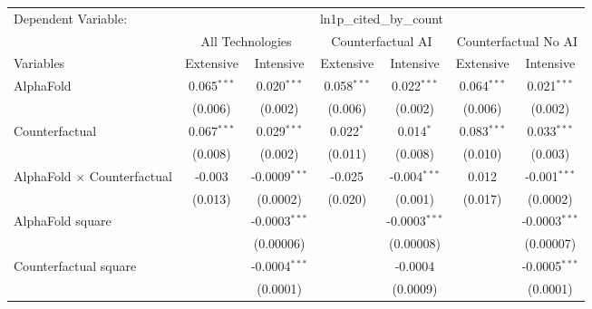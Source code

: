 \begingroup
\centering
\begin{tabular}{lcccccc}
   \tabularnewline \midrule \midrule
   Dependent Variable: & \multicolumn{6}{c}{ln1p\_cited\_by\_count}\\
 & \multicolumn{2}{c}{All Technologies} & \multicolumn{2}{c}{Counterfactual AI} & \multicolumn{2}{c}{Counterfactual No AI} \\
\cmidrule(lr){1-1}\cmidrule(lr){2-3} \cmidrule(lr){4-5} \cmidrule(lr){6-7}
Variables & \multicolumn{1}{c}{Extensive} & \multicolumn{1}{c}{Intensive} & \multicolumn{1}{c}{Extensive} & \multicolumn{1}{c}{Intensive} & \multicolumn{1}{c}{Extensive} & \multicolumn{1}{c}{Intensive} \\
\cmidrule(lr){1-1}\cmidrule(lr){2-2} \cmidrule(lr){3-3} \cmidrule(lr){4-4} \cmidrule(lr){5-5} \cmidrule(lr){6-6} \cmidrule(lr){7-7}
   AlphaFold                          & 0.065$^{***}$ & 0.020$^{***}$     & 0.058$^{***}$ & 0.022$^{***}$    & 0.064$^{***}$ & 0.021$^{***}$\\   
                                      & (0.006)       & (0.002)           & (0.006)       & (0.002)          & (0.006)       & (0.002)\\   
   Counterfactual                     & 0.067$^{***}$ & 0.029$^{***}$     & 0.022$^{*}$   & 0.014$^{*}$      & 0.083$^{***}$ & 0.033$^{***}$\\   
                                      & (0.008)       & (0.002)           & (0.011)       & (0.008)          & (0.010)       & (0.003)\\   
   AlphaFold $\times$ Counterfactual  & -0.003        & -0.0009$^{***}$   & -0.025        & -0.004$^{***}$   & 0.012         & -0.001$^{***}$\\   
                                      & (0.013)       & (0.0002)          & (0.020)       & (0.001)          & (0.017)       & (0.0002)\\   
   AlphaFold square                   &               & -0.0003$^{***}$   &               & -0.0003$^{***}$  &               & -0.0003$^{***}$\\   
                                      &               & (0.00006)         &               & (0.00008)        &               & (0.00007)\\   
   Counterfactual square              &               & -0.0004$^{***}$   &               & -0.0004          &               & -0.0005$^{***}$\\   
                                      &               & (0.0001)          &               & (0.0009)         &               & (0.0001)\\   

\end{tabular}
